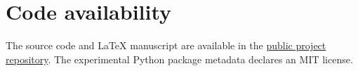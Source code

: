 \section*{Code availability}
\label{sec:code_availability}
The source code and LaTeX manuscript are available in the \href{https://github.com/unsa-semester-2026-A/ia_article}{public project repository}. The experimental Python package metadata declares an MIT license.
